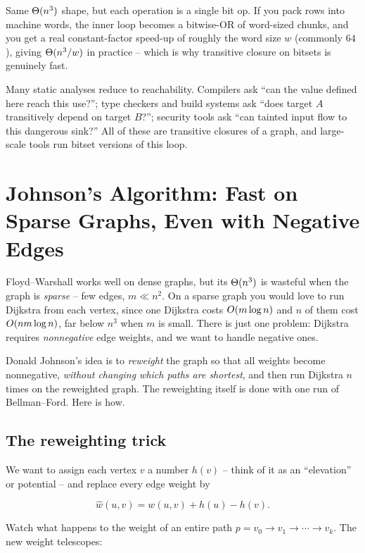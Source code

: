 Same $\Theta(n^3)$ shape, but each operation is a single bit op. If you pack rows
into machine words, the inner loop becomes a bitwise-OR of word-sized chunks,
and you get a real constant-factor speed-up of roughly the word size $w$
(commonly $64$), giving $\Theta(n^3 / w)$ in practice -- which is why transitive
closure on bitsets is genuinely fast.

\begin{aestheticbox}
Many static analyses reduce to reachability. Compilers ask ``can the value
defined here reach this use?''; type checkers and build systems ask ``does
target $A$ transitively depend on target $B$?''; security tools ask ``can
tainted input flow to this dangerous sink?'' All of these are transitive
closures of a graph, and large-scale tools run bitset versions of this
loop.
\end{aestheticbox}

\section{Johnson's Algorithm: Fast on Sparse Graphs, Even with Negative Edges}
\label{ch25:johnson}

Floyd--Warshall works well on dense graphs, but its $\Theta(n^3)$ is wasteful when
the graph is \emph{sparse} -- few edges, $m \ll n^2$. On a sparse graph you
would love to run Dijkstra from each vertex, since one Dijkstra costs
$O(m \log n)$ and $n$ of them cost $O(n m \log n)$, far below $n^3$ when
$m$ is small. There is just one problem: Dijkstra requires \emph{nonnegative}
edge weights, and we want to handle negative ones.

Donald Johnson's idea is to \emph{reweight} the graph so that all
weights become nonnegative, \emph{without changing which paths are shortest},
and then run Dijkstra $n$ times on the reweighted graph. The reweighting itself
is done with one run of Bellman--Ford. Here is how.

\subsection{The reweighting trick}

We want to assign each vertex $v$ a number $h(v)$ -- think of it as an
``elevation'' or potential -- and replace every edge weight by

\[
\hat{w}(u, v) = w(u, v) + h(u) - h(v).
\]

Watch what happens to the weight of an entire path $p = v_0 \to v_1 \to \cdots
\to v_k$. The new weight telescopes:

